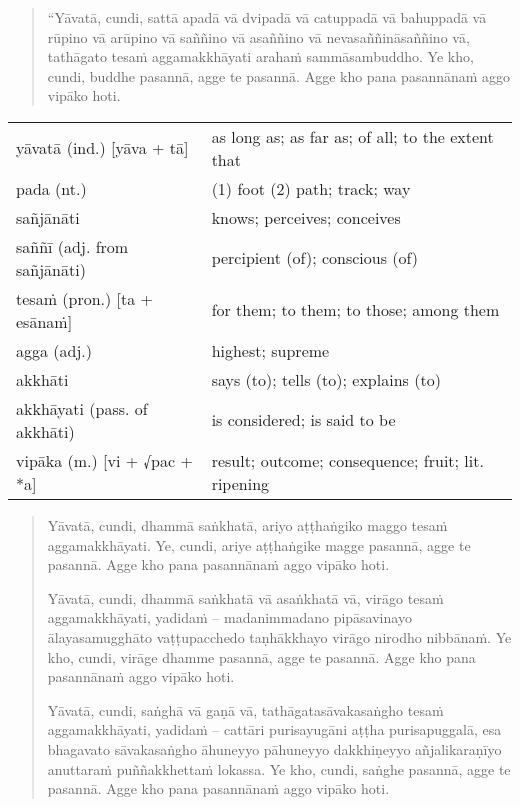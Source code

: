 \documentclass[11pt,oneside]{memoir}
\begin{document}
\begin{quote}
“Yāvatā, cundi, sattā apadā vā dvipadā vā catuppadā vā bahuppadā vā rūpino vā
arūpino vā saññino vā asaññino vā nevasaññināsaññino vā,
tathāgato tesaṁ aggamakkhāyati arahaṁ sammāsambuddho.
Ye kho, cundi, buddhe pasannā, agge te pasannā.
Agge kho pana pasannānaṁ aggo vipāko hoti.
\end{quote}

\begin{longtable}{L{\colOne} L{\colTwo}}
yāvatā (ind.) [yāva + tā] & as long as; as far as; of all; to the extent that\\[0pt]
pada (nt.) & (1) foot (2) path; track; way\\[0pt]
sañjānāti & knows; perceives; conceives\\[0pt]
saññī (adj. from sañjānāti) & percipient (of); conscious (of)\\[0pt]
tesaṁ (pron.) [ta + esānaṁ] & for them; to them; to those; among them\\[0pt]
agga (adj.) & highest; supreme\\[0pt]
akkhāti & says (to); tells (to); explains (to)\\[0pt]
akkhāyati (pass. of akkhāti) & is considered; is said to be\\[0pt]
vipāka (m.) [vi + √pac + *a] & result; outcome; consequence; fruit; lit. ripening\\[0pt]
\end{longtable}

\clearpage

\begin{quote}
Yāvatā, cundi, dhammā saṅkhatā, ariyo aṭṭhaṅgiko maggo tesaṁ aggamakkhāyati.
Ye, cundi, ariye aṭṭhaṅgike magge pasannā, agge te pasannā.
Agge kho pana pasannānaṁ aggo vipāko hoti.

Yāvatā, cundi, dhammā saṅkhatā vā asaṅkhatā vā, virāgo tesaṁ aggamakkhāyati,
yadidaṁ -- madanimmadano pipāsavinayo ālayasamugghāto vaṭṭupacchedo taṇhākkhayo
virāgo nirodho nibbānaṁ.
Ye kho, cundi, virāge dhamme pasannā, agge te pasannā.
Agge kho pana pasannānaṁ aggo vipāko hoti.

Yāvatā, cundi, saṅghā vā gaṇā vā, tathāgatasāvakasaṅgho tesaṁ aggamakkhāyati,
yadidaṁ -- cattāri purisayugāni aṭṭha purisapuggalā, esa bhagavato sāvakasaṅgho
āhuneyyo pāhuneyyo dakkhiṇeyyo añjalikaraṇīyo anuttaraṁ puññakkhettaṁ lokassa.
Ye kho, cundi, saṅghe pasannā, agge te pasannā.
Agge kho pana pasannānaṁ aggo vipāko hoti.
\end{quote}
\end{document}
